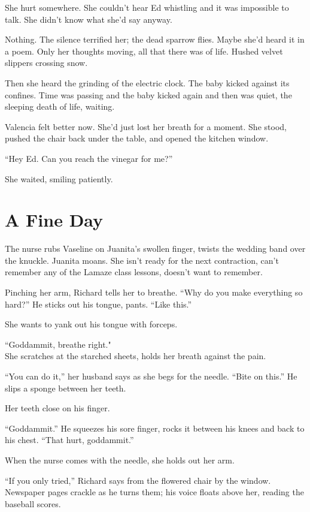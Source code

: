 \documentclass[twoside,10pt]{book}
\begin{document}
She hurt somewhere. She couldn't hear Ed whistling and it was impossible
to talk. She didn't know what she'd say anyway.

Nothing. The silence terrified her; the dead sparrow flies. Maybe she'd
heard it in a poem. Only her thoughts moving, all that there was of
life. Hushed velvet slippers crossing snow.

Then she heard the grinding of the electric clock. The baby kicked
against its confines. Time was passing and the baby kicked again and
then was quiet, the sleeping death of life, waiting.

Valencia felt better now. She'd just lost her breath for a moment. She
stood, pushed the chair back under the table, and opened the kitchen
window.

``Hey Ed. Can you reach the vinegar for me?''

She waited, smiling patiently.



\cleardoublepage
\chapter{A Fine Day}

The nurse rubs Vaseline on Juanita's swollen finger, twists the wedding
band over the knuckle. Juanita moans. She isn't ready for the next
contraction, can't remember any of the Lamaze class lessons, doesn't
want to remember.

Pinching her arm, Richard tells her to breathe. ``Why do you make
everything so hard?'' He sticks out his tongue, pants. ``Like this.''

She wants to yank out his tongue with forceps.

``Goddammit, breathe right."\\
She scratches at the starched sheets, holds her breath against the pain.

``You can do it,'' her husband says as she begs for the needle. ``Bite
on this.'' He slips a sponge between her teeth.

Her teeth close on his finger.

``Goddammit.'' He squeezes his sore finger, rocks it between his knees
and back to his chest. ``That hurt, goddammit.''

When the nurse comes with the needle, she holds out her arm.

``If you only tried,'' Richard says from the flowered chair by the
window. Newspaper pages crackle as he turns them; his voice floats above
her, reading the baseball scores.
\end{document}
